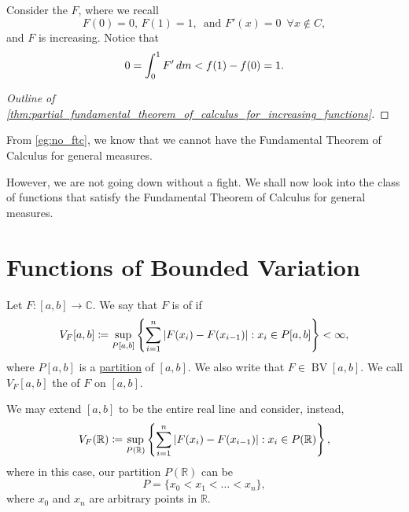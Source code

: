 \documentclass[notoc,notitlepage]{tufte-book}
\DeclareMathOperator{\BV}{BV}
\begin{document}
\begin{eg}\label{eg:no_ftc}
  Consider the  $F$,
  where we recall
  \begin{equation*}
    F(0) = 0,\, F(1) = 1,\, \text{ and } F'(x) = 0\enspace \forall x \notin C,
  \end{equation*}
  and $F$ is increasing. Notice that
  \begin{equation*}
    0 = \int_{0}^{1} F' \mathop{}\!d{m} < f(1) - f(0) = 1.
  \end{equation*}
\end{eg}

\begin{proof}[Outline of \cref{thm:partial_fundamental_theorem_of_calculus_for_increasing_functions}]
\end{proof}

\begin{remark}
  From \cref{eg:no_ftc}, we know that we cannot have the Fundamental Theorem of
  Calculus for general measures.
\end{remark}

However, we are not going down without a fight.
We shall now look into the class of functions that satisfy the
Fundamental Theorem of Calculus for general measures.


\section{Functions of Bounded Variation}%
\label{sec:functions_of_bounded_variation}

\begin{defn}\label{defn:functions_of_bounded_variation}
  Let $F : [a, b] \to \mathbb{C}$. 
  We say that $F$ is of  if
  \begin{equation*}
    V_F[a, b] \coloneqq \sup_{P[a, b]} \left\{ 
      \sum_{i=1}^{n} \left|F(x_i) - F(x_{i-1})\right| : x_i \in P[a, b]
    \right\} < \infty,
  \end{equation*}
  where $P[a, b]$ is a \hyperref[defn:riemann_integration]{partition} of $[a, b]$.
  We also write that $F \in \BV[a, b]$.
  We call $V_F[a, b]$ the  of $F$ on $[a, b]$.

  We may extend $[a, b]$ to be the entire real line and consider, instead,
  \begin{equation*}
    V_F(\mathbb{R}) \coloneqq \sup_{P(\mathbb{R})} \left\{ 
      \sum_{i=1}^{n} \left|F(x_i) - F(x_{i-1})\right| : x_i \in P(\mathbb{R})
    \right\},
  \end{equation*}
  where in this case, our partition $P(\mathbb{R})$ can be
  \begin{equation*}
    P = \{ x_0 < x_1 < \hdots < x_n \},
  \end{equation*}
  where $x_0$ and $x_n$ are arbitrary points in $\mathbb{R}$.
\end{defn}
\end{document}
